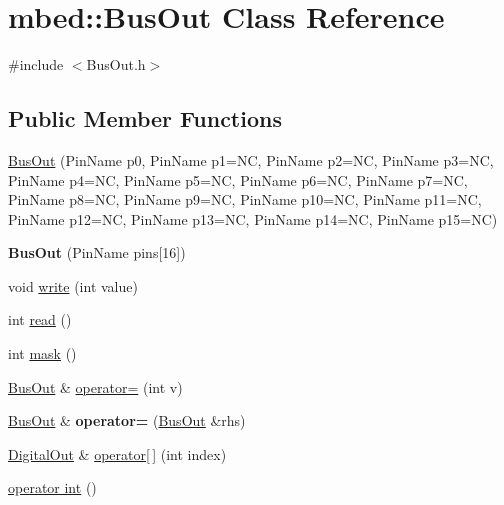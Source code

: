 \hypertarget{classmbed_1_1_bus_out}{}\section{mbed\+:\+:Bus\+Out Class Reference}
\label{classmbed_1_1_bus_out}


{\ttfamily \#include $<$Bus\+Out.\+h$>$}

\subsection*{Public Member Functions}
\begin{DoxyCompactItemize}
\item 
\hyperlink{classmbed_1_1_bus_out_a05733cb6ed754af032de0be4d02c4604}{Bus\+Out} (Pin\+Name p0, Pin\+Name p1=NC, Pin\+Name p2=NC, Pin\+Name p3=NC, Pin\+Name p4=NC, Pin\+Name p5=NC, Pin\+Name p6=NC, Pin\+Name p7=NC, Pin\+Name p8=NC, Pin\+Name p9=NC, Pin\+Name p10=NC, Pin\+Name p11=NC, Pin\+Name p12=NC, Pin\+Name p13=NC, Pin\+Name p14=NC, Pin\+Name p15=NC)
\item 
{\bfseries Bus\+Out} (Pin\+Name pins\mbox{[}16\mbox{]})\hypertarget{classmbed_1_1_bus_out_adf835a7d7d6f901a96b2d07c9ba495d8}{}\label{classmbed_1_1_bus_out_adf835a7d7d6f901a96b2d07c9ba495d8}

\item 
void \hyperlink{classmbed_1_1_bus_out_a907cb408dae3f4808ed5d580da4dcae9}{write} (int value)
\item 
int \hyperlink{classmbed_1_1_bus_out_afd5c1c6fe1697c32f8976bec51d6c7e7}{read} ()
\item 
int \hyperlink{classmbed_1_1_bus_out_a59a7cd605bd6d2b3eb717497c62d061a}{mask} ()
\item 
\hyperlink{classmbed_1_1_bus_out}{Bus\+Out} \& \hyperlink{classmbed_1_1_bus_out_a041460a5044d63235efbe517a3e20d28}{operator=} (int v)
\item 
\hyperlink{classmbed_1_1_bus_out}{Bus\+Out} \& {\bfseries operator=} (\hyperlink{classmbed_1_1_bus_out}{Bus\+Out} \&rhs)\hypertarget{classmbed_1_1_bus_out_a35fd8464ad606bf950564b179090a4d5}{}\label{classmbed_1_1_bus_out_a35fd8464ad606bf950564b179090a4d5}

\item 
\hyperlink{classmbed_1_1_digital_out}{Digital\+Out} \& \hyperlink{classmbed_1_1_bus_out_afbe6d93bfa9c657129acb49ad0691bf4}{operator\mbox{[}$\,$\mbox{]}} (int index)
\item 
\hyperlink{classmbed_1_1_bus_out_aea2726eb3c2774945f4e79114839fe75}{operator int} ()
\end{DoxyCompactItemize}
